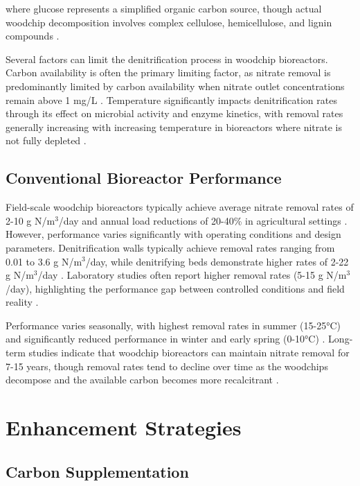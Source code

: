 \documentclass[12pt,a4paper]{article}
\begin{document}
where glucose represents a simplified organic carbon source, though actual woodchip decomposition involves complex cellulose, hemicellulose, and lignin compounds \citep{RN725}.

Several factors can limit the denitrification process in woodchip bioreactors. Carbon availability is often the primary limiting factor, as nitrate removal is predominantly limited by carbon availability when nitrate outlet concentrations remain above 1 mg/L \citep{RN629, RN242}. Temperature significantly impacts denitrification rates through its effect on microbial activity and enzyme kinetics, with removal rates generally increasing with increasing temperature in bioreactors where nitrate is not fully depleted \citep{RN625, RN228, RN258}.

\subsection{Conventional Bioreactor Performance}

Field-scale woodchip bioreactors typically achieve average nitrate removal rates of 2-10 g N/m$^3$/day and annual load reductions of 20-40\% in agricultural settings \citep{RN312, RN310}. However, performance varies significantly with operating conditions and design parameters. Denitrification walls typically achieve removal rates ranging from 0.01 to 3.6 g N/m$^3$/day, while denitrifying beds demonstrate higher rates of 2-22 g N/m$^3$/day \citep{RN625, RN629}. Laboratory studies often report higher removal rates (5-15 g N/m$^3$/day), highlighting the performance gap between controlled conditions and field reality \citep{new_ref_4}.

Performance varies seasonally, with highest removal rates in summer (15-25°C) and significantly reduced performance in winter and early spring (0-10°C) \citep{RN228, RN228, RN258}. Long-term studies indicate that woodchip bioreactors can maintain nitrate removal for 7-15 years, though removal rates tend to decline over time as the woodchips decompose and the available carbon becomes more recalcitrant \citep{RN629, RN629}.

\section{Enhancement Strategies}

\subsection{Carbon Supplementation}
\end{document}
